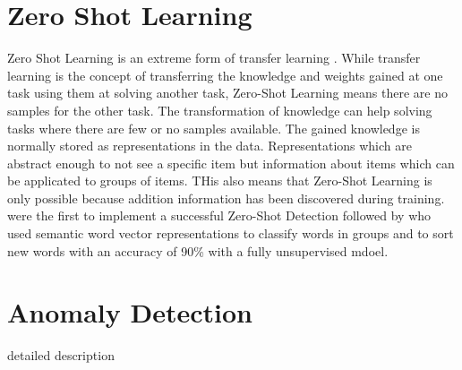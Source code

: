 \section{Zero Shot Learning}
Zero Shot Learning is an extreme form of transfer learning \cite[S. 536]{goodfellow_deep_2016}. While transfer learning is the concept of transferring the knowledge and weights gained at one task using them at solving another task, Zero-Shot Learning means there are no samples for the other task. The transformation of knowledge can help solving tasks where there are few or no samples available. The gained knowledge is normally stored as representations in the data. Representations which are abstract enough to not see a specific item but information about items which can be applicated to groups of items. THis also means that Zero-Shot Learning is only possible because addition information has been discovered during training.\\
\cite{palatucci_zero-shot_2009} were the first to implement a successful Zero-Shot Detection followed by \cite{socher_zero-shot_2013} who used semantic word vector representations to classify words in groups and to sort new words with an accuracy of 90\% with a fully unsupervised mdoel.
\section{Anomaly Detection}
detailed description

